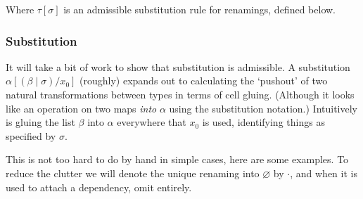 \documentclass[10pt]{article}
\let\emptyset\varnothing
\newcommand{\yields}{\vdash}
\newcommand{\type}{\,\,\mathsf{type}}
\begin{document}

Where $\tau[\sigma]$ is an admissible substitution rule for renamings, defined below.

\subsubsection{Substitution}

It will take a bit of work to show that substitution is admissible. A substitution $\alpha[(\beta \mid \sigma) / x_0]$ (roughly) expands out to calculating the `pushout' of two natural transformations between types in terms of cell gluing. (Although it looks like an operation on two maps \emph{into} $\alpha$ using the substitution notation.) Intuitively is gluing the list $\beta$ into $\alpha$ everywhere that $x_0$ is used, identifying things as specified by $\sigma$.

This is not too hard to do by hand in simple cases, here are some examples. To reduce the clutter we will denote the unique renaming into $\emptyset$ by $\cdot$, and when it is used to attach a dependency, omit entirely.
\end{document}
